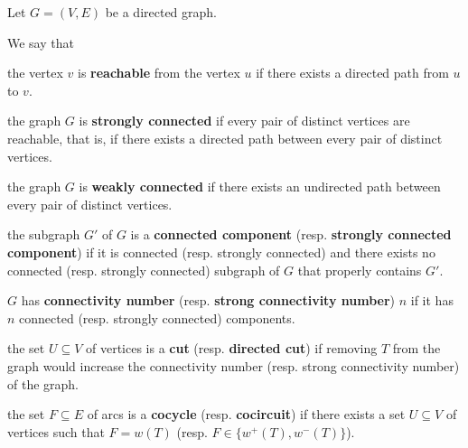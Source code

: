 \begin{definition}\label{def:graph_connectivity}
  Let \( G = (V, E) \) be a directed graph.

  We say that
  \begin{defenum}
     the vertex \( v \) is \textbf{reachable} from the vertex \( u \) if there exists a directed path from \( u \) to \( v \).

    \cite[chapter 1, section 3.5]{Gondran1984} the graph \( G \) is \textbf{strongly connected} if every pair of distinct vertices are reachable, that is, if there exists a directed path between every pair of distinct vertices.

    \cite[chapter 1, section 3.3]{Gondran1984} the graph \( G \) is \textbf{weakly connected} if there exists an undirected path between every pair of distinct vertices.

    \cite[chapter 1, sections 3.3 and 3.5]{Gondran1984} the subgraph \( G' \) of \( G \) is a \textbf{connected component} (resp. \textbf{strongly connected component}) if it is connected (resp. strongly connected) and there exists no connected (resp. strongly connected) subgraph of \( G \) that properly contains \( G' \).

    \cite[chapter 1, sections 3.3 and 3.5]{Gondran1984} \( G \) has \textbf{connectivity number} (resp. \textbf{strong connectivity number}) $n$ if it has $n$ connected (resp. strongly connected) components.

    \cite[chapter 1, section 3.4]{Gondran1984} the set \( U \subseteq V \) of vertices is a \textbf{cut} (resp. \textbf{directed cut}) if removing \( T \) from the graph would increase the connectivity number (resp. strong connectivity number) of the graph.

    \cite[chapter 1, section 4.4]{Gondran1984} the set \( F \subseteq E \) of arcs is a \textbf{cocycle} (resp. \textbf{cocircuit}) if there exists a set \( U \subseteq V \) of vertices such that \( F = w(T) \) (resp. \( F \in \{ w^+(T), w^-(T) \} \)).
  \end{defenum}
\end{definition}

